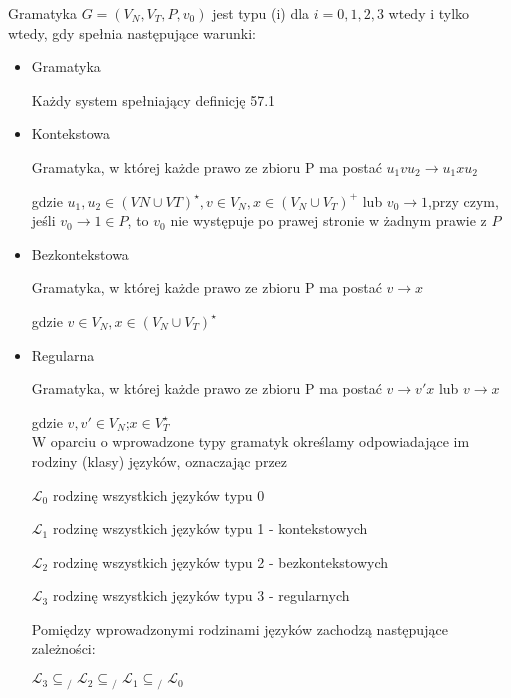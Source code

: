 \documentclass[main.tex]{subfiles}
\begin{document}
    \begin{definition}
        Gramatyka $G=(V_N,V_T,P,v_0)$ jest typu (i) dla $i=0,1,2,3$ wtedy i tylko wtedy, gdy spełnia następujące warunki:

        \begin{itemize}
            \item Gramatyka

            Każdy system spełniający definicję 57.1
            \item Kontekstowa

            Gramatyka, w której każde prawo ze zbioru P ma postać $u_1 v u_2 \rightarrow u_1 x u_2$

            gdzie $u_1,u_2 \in (VN \cup VT)^\star,v \in V_N,x \in (V_N \cup V_T)^+$ lub $v_0 \rightarrow 1$,przy czym, jeśli $v_0 \rightarrow 1 \in P$, to $v_0$ nie występuje po prawej stronie w żadnym prawie z $P$

            \item Bezkontekstowa

            Gramatyka, w której każde prawo ze zbioru P ma postać
            $v \rightarrow x$

            gdzie $v \in V_N, x \in (V_N \cup V_T)^\star$

            \item Regularna

            Gramatyka, w której każde prawo ze zbioru P ma postać
            $v \rightarrow v'x$ lub $v \rightarrow x$

            gdzie $v,v' \in V_N$;$x \in V_T^\star$
            \\


            W oparciu o wprowadzone typy gramatyk określamy odpowiadające im rodziny (klasy) języków, oznaczając przez

            $\mathbf{\mathcal{L}}_{0}$ rodzinę wszystkich języków typu 0

            $\mathbf{\mathcal{L}}_{1}$ rodzinę wszystkich języków typu 1 - kontekstowych

            $\mathbf{\mathcal{L}}_{2}$ rodzinę wszystkich języków typu 2 - bezkontekstowych

            $\mathbf{\mathcal{L}}_{3}$ rodzinę wszystkich języków typu 3 - regularnych

            Pomiędzy wprowadzonymi rodzinami języków zachodzą następujące zależności:

            $\mathbf{\mathcal{L}}_{3}\subseteq \! \! \! \! \! _{/\; \, }\mathbf{\mathcal{L}}_{2}\subseteq \! \! \! \! \! _{/\; \, }\mathbf{\mathcal{L}} _{1}\subseteq \! \! \! \! \! _{/\; \, }\mathbf{\mathcal{L}}_{0}$

        \end{itemize}

    \end{definition}
\end{document}
